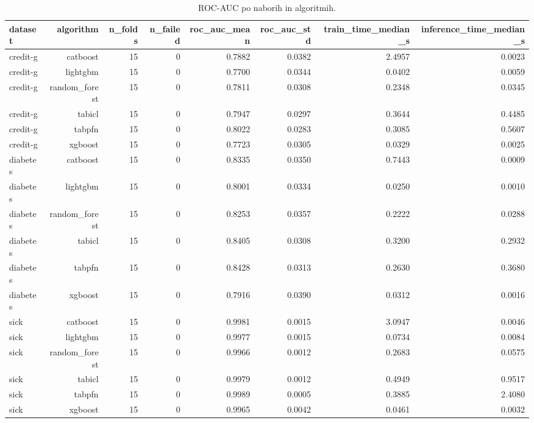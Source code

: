 \begin{table}[htbp]
\centering
\caption{ROC-AUC po naborih in algoritmih.}
\label{tab:per-dataset}
\begin{tabular}{lrrrrrrr}
\hline
dataset & algorithm & n\_folds & n\_failed & roc\_auc\_mean & roc\_auc\_std & train\_time\_median\_s & inference\_time\_median\_s \\
\hline
credit-g & catboost & 15 & 0 & 0.7882 & 0.0382 & 2.4957 & 0.0023 \\
credit-g & lightgbm & 15 & 0 & 0.7700 & 0.0344 & 0.0402 & 0.0059 \\
credit-g & random\_forest & 15 & 0 & 0.7811 & 0.0308 & 0.2348 & 0.0345 \\
credit-g & tabicl & 15 & 0 & 0.7947 & 0.0297 & 0.3644 & 0.4485 \\
credit-g & tabpfn & 15 & 0 & 0.8022 & 0.0283 & 0.3085 & 0.5607 \\
credit-g & xgboost & 15 & 0 & 0.7723 & 0.0305 & 0.0329 & 0.0025 \\
diabetes & catboost & 15 & 0 & 0.8335 & 0.0350 & 0.7443 & 0.0009 \\
diabetes & lightgbm & 15 & 0 & 0.8001 & 0.0334 & 0.0250 & 0.0010 \\
diabetes & random\_forest & 15 & 0 & 0.8253 & 0.0357 & 0.2222 & 0.0288 \\
diabetes & tabicl & 15 & 0 & 0.8405 & 0.0308 & 0.3200 & 0.2932 \\
diabetes & tabpfn & 15 & 0 & 0.8428 & 0.0313 & 0.2630 & 0.3680 \\
diabetes & xgboost & 15 & 0 & 0.7916 & 0.0390 & 0.0312 & 0.0016 \\
sick & catboost & 15 & 0 & 0.9981 & 0.0015 & 3.0947 & 0.0046 \\
sick & lightgbm & 15 & 0 & 0.9977 & 0.0015 & 0.0734 & 0.0084 \\
sick & random\_forest & 15 & 0 & 0.9966 & 0.0012 & 0.2683 & 0.0575 \\
sick & tabicl & 15 & 0 & 0.9979 & 0.0012 & 0.4949 & 0.9517 \\
sick & tabpfn & 15 & 0 & 0.9989 & 0.0005 & 0.3885 & 2.4080 \\
sick & xgboost & 15 & 0 & 0.9965 & 0.0042 & 0.0461 & 0.0032 \\
\hline
\end{tabular}
\end{table}
